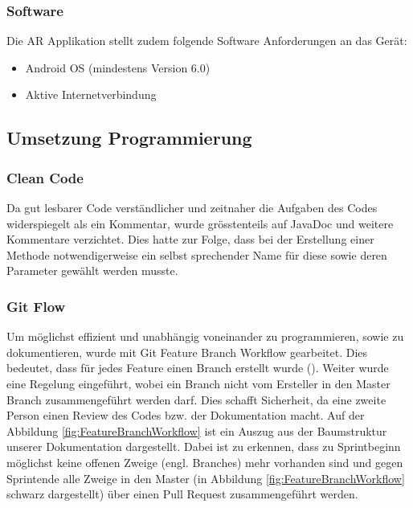 \documentclass[a4paper]{scrreprt}
\begin{document}
\subsubsection{Software}

Die AR Applikation stellt zudem folgende Software Anforderungen an das Gerät:

\begin{itemize}
	\item Android OS (mindestens Version 6.0)
	\item Aktive Internetverbindung
\end{itemize}

\subsection{Umsetzung Programmierung}

\subsubsection{Clean Code}

Da gut lesbarer Code verständlicher und zeitnaher die Aufgaben des Codes widerspiegelt als ein Kommentar, wurde grösstenteils auf JavaDoc und weitere Kommentare verzichtet. Dies hatte zur Folge, dass bei der Erstellung einer Methode notwendigerweise ein selbst sprechender Name für diese sowie deren Parameter gewählt werden musste.

\subsubsection{Git Flow}

Um möglichst effizient und unabhängig voneinander zu programmieren, sowie zu dokumentieren, wurde mit Git Feature Branch Workflow gearbeitet. Dies bedeutet, dass für jedes Feature einen Branch erstellt wurde (\cite{gitFeatureBranchWorkflow}). Weiter wurde eine Regelung eingeführt, wobei ein Branch nicht vom Ersteller in den Master Branch zusammengeführt werden darf. Dies schafft Sicherheit, da eine zweite Person einen Review des Codes bzw. der Dokumentation macht.
Auf der Abbildung \ref{fig:FeatureBranchWorkflow} ist ein Auszug aus der Baumstruktur unserer Dokumentation dargestellt. Dabei ist zu erkennen, dass zu Sprintbeginn möglichst keine offenen Zweige (engl. Branches) mehr vorhanden sind und gegen Sprintende alle Zweige in den Master (in Abbildung \ref{fig:FeatureBranchWorkflow} schwarz dargestellt) über einen Pull Request zusammengeführt werden.
\end{document}

